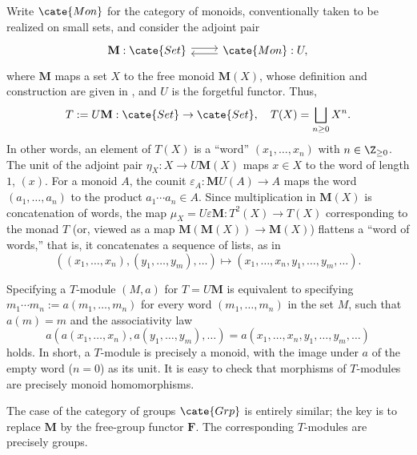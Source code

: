 \begin{example}\label{eg:Mon-monad}
	Write $\cate{Mon}$ for the category of monoids, conventionally taken to be
	realized on small sets, and consider the adjoint pair
	\[\begin{tikzcd}
		\mathbf{M}: \cate{Set} \arrow[r, shift left] & \cate{Mon}: U, \arrow[l, shift left]
	\end{tikzcd}\]
	where $\mathbf{M}$ maps a set $X$ to the free monoid $\mathbf{M}(X)$,
	whose definition and construction are given in
	\cite[Definition 4.8.1, Lemma 4.8.4]{Li1}, and $U$ is the forgetful
	functor. Thus,
	\[ T := U\mathbf{M}: \cate{Set} \to \cate{Set}, \quad T(X) = \bigsqcup_{n \geq 0} X^n. \]
	In other words, an element of $T(X)$ is a ``word''
	$(x_1,\ldots,x_n)$ with $n\in\Z_{\geq0}$. The unit of the adjoint pair
	$\eta_X:X\to U\mathbf{M}(X)$ maps $x\in X$ to the word of length $1$,
	$(x)$. For a monoid $A$, the counit
	$\varepsilon_A:\mathbf{M}U(A)\to A$ maps the word
	$(a_1,\ldots,a_n)$ to the product $a_1\cdots a_n\in A$. Since
	multiplication in $\mathbf{M}(X)$ is concatenation of words, the map
	$\mu_X=U\varepsilon\mathbf{M}:T^2(X)\to T(X)$ corresponding to the monad
	$T$ (or, viewed as a map
	$\mathbf{M}(\mathbf{M}(X))\to\mathbf{M}(X)$) flattens a ``word of
	words,'' that is, it concatenates a sequence of lists, as in
	\[ \left( (x_1, \ldots, x_n), (y_1, \ldots, y_m), \ldots \right) \mapsto \left( x_1, \ldots, x_n, y_1, \ldots, y_m, \ldots \right). \]

	Specifying a $T$-module $(M,a)$ for $T=U\mathbf{M}$ is equivalent to
	specifying $m_1\cdots m_n:=a(m_1,\ldots,m_n)$ for every word
	$(m_1,\ldots,m_n)$ in the set $M$, such that $a(m)=m$ and the
	associativity law
	\[ a\left( a(x_1, \ldots, x_n), a(y_1, \ldots, y_m), \ldots \right) = a\left( x_1, \ldots, x_n, y_1, \ldots, y_m, \ldots \right) \]
	holds. In short, a $T$-module is precisely a monoid, with the image under
	$a$ of the empty word ($n=0$) as its unit. It is easy to check that
	morphisms of $T$-modules are precisely monoid homomorphisms.

	The case of the category of groups $\cate{Grp}$ is entirely similar; the
	key is to replace $\mathbf{M}$ by the free-group functor $\mathbf{F}$. The
	corresponding $T$-modules are precisely groups.
\end{example}

